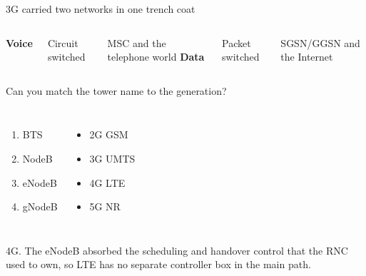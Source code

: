 \begin{frame}{3G carried two networks in one trench coat}
  \vspace{0.5em}
  \begin{columns}[T,onlytextwidth]
      \centering
      \Huge\textcolor{coreorange}{\textbf{Voice}}

      \vspace{0.6em}
      \Large Circuit switched

      \vspace{0.5em}
      \normalsize MSC and the telephone world
      \centering
      \Huge\textcolor{ranblue}{\textbf{Data}}

      \vspace{0.6em}
      \Large Packet switched

      \vspace{0.5em}
      \normalsize SGSN/GGSN and the Internet
  \end{columns}

  \vspace{1.2em}
\end{frame}

\begin{frame}{Can you match the tower name to the generation?}
  \vspace{0.5em}
  \begin{columns}[T,onlytextwidth]
      \large
      \begin{enumerate}\itemsep4pt
        \item BTS
        \item NodeB
        \item eNodeB
        \item gNodeB
      \end{enumerate}
      \large
      \begin{itemize}\itemsep4pt
        \item 2G GSM
        \item 3G UMTS
        \item 4G LTE
        \item 5G NR
      \end{itemize}
  \end{columns}


  \vspace{0.9em}
     {4G. The eNodeB absorbed the scheduling and handover control that the RNC
      used to own, so LTE has no separate controller box in the main path.}
\end{frame}

